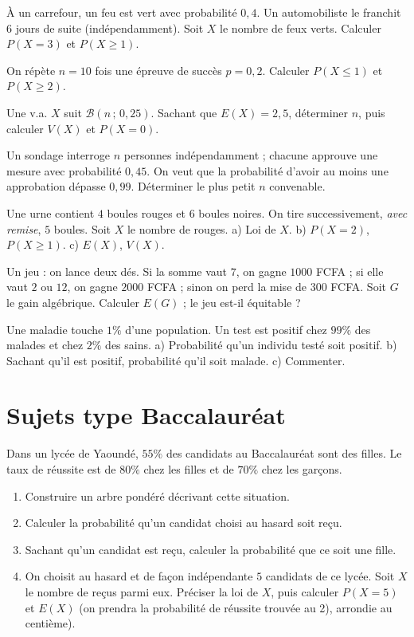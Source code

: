 \exo{} À un carrefour, un feu est vert avec probabilité $0{,}4$. Un
automobiliste le franchit $6$ jours de suite (indépendamment). Soit $X$ le nombre
de feux verts. Calculer $P(X{=}3)$ et $P(X\ge1)$.

\exo{} On répète $n=10$ fois une épreuve de succès $p=0{,}2$. Calculer
$P(X\le1)$ et $P(X\ge2)$.

\exo{} Une v.a. $X$ suit $\mathcal B(n\,;\,0{,}25)$. Sachant que
$E(X)=2{,}5$, déterminer $n$, puis calculer $V(X)$ et $P(X{=}0)$.

\exo{} Un sondage interroge $n$ personnes indépendamment ; chacune approuve
une mesure avec probabilité $0{,}45$. On veut que la probabilité d'avoir au moins
une approbation dépasse $0{,}99$. Déterminer le plus petit $n$ convenable.

\exo{} Une urne contient $4$ boules rouges et $6$ boules noires. On tire
successivement, \emph{avec remise}, $5$ boules. Soit $X$ le nombre de rouges.
a) Loi de $X$. b) $P(X{=}2)$, $P(X\ge1)$. c) $E(X)$, $V(X)$.

\exo{} Un jeu : on lance deux dés. Si la somme vaut $7$, on gagne $1000$
FCFA ; si elle vaut $2$ ou $12$, on gagne $2000$ FCFA ; sinon on perd la mise de
$300$ FCFA. Soit $G$ le gain algébrique. Calculer $E(G)$ ; le jeu est-il équitable ?

\exo{} Une maladie touche $1\%$ d'une population. Un test est positif chez
$99\%$ des malades et chez $2\%$ des sains. a) Probabilité qu'un individu testé
soit positif. b) Sachant qu'il est positif, probabilité qu'il soit malade.
c) Commenter.

\section{Sujets type Baccalauréat}

Dans un lycée de Yaoundé, $55\%$ des candidats au Baccalauréat sont des filles.
Le taux de réussite est de $80\%$ chez les filles et de $70\%$ chez les garçons.
\begin{enumerate}[label=\arabic*)]
\item Construire un arbre pondéré décrivant cette situation.
\item Calculer la probabilité qu'un candidat choisi au hasard soit reçu.
\item Sachant qu'un candidat est reçu, calculer la probabilité que ce soit une fille.
\item On choisit au hasard et de façon indépendante $5$ candidats de ce lycée.
Soit $X$ le nombre de reçus parmi eux. Préciser la loi de $X$, puis calculer
$P(X{=}5)$ et $E(X)$ (on prendra la probabilité de réussite trouvée au 2), arrondie
au centième).
\end{enumerate}

